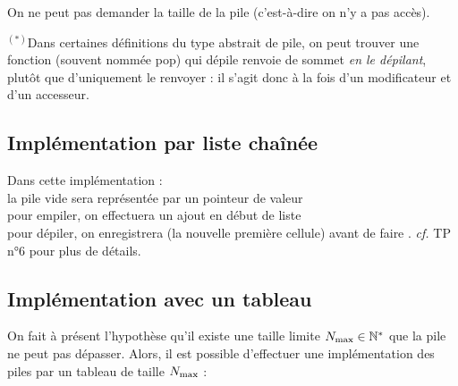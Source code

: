 		\begin{Remarque}
			On ne peut pas demander la taille de la pile (c'est-à-dire on n'y a pas accès).
		\end{Remarque}
		
		\begin{Remarque}
			$^{(*)}$Dans certaines définitions du type abstrait de pile, on peut trouver une fonction (souvent nommée \textsf{pop}) qui dépile renvoie de sommet \emph{en le dépilant}, plutôt que d'uniquement le renvoyer : il s'agit donc à la fois d'un modificateur et d'un accesseur.
		\end{Remarque}
	
	\subsection{Implémentation par liste chaînée}
		
		Dans cette implémentation : \\
			 \bdot la pile vide sera représentée par un pointeur de valeur  \\
			 \bdot pour empiler, on effectuera un ajout en début de liste \\
			 \bdot pour dépiler, on enregistrera  (la nouvelle première cellule) avant de faire . \nll
		\emph{cf.} TP n°6 pour plus de détails.
		
	\subsection{Implémentation avec un tableau}
	
		On fait à présent l'hypothèse qu'il existe une taille limite \(N_\rm{max}\in\bb{N}^*\) que la pile ne peut pas dépasser. Alors, il est possible d'effectuer une implémentation des piles par un tableau de taille \(N_\rm{max}\) : 
			
